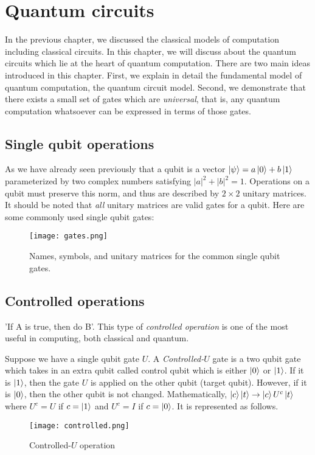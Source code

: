 \section{Quantum circuits}

In the previous chapter, we discussed the classical models of computation including classical circuits. In this chapter, we will discuss about the quantum circuits which lie at the heart of quantum computation. There are two main ideas introduced in this chapter. First, we explain in detail the fundamental model of quantum computation, the quantum circuit model. Second, we demonstrate that there exists a small set of gates which are \textit{universal}, that is, any quantum computation whatsoever can be expressed in terms of those gates.

\subsection{Single qubit operations}

As we have already seen previously that a qubit is a vector $\ket{\psi} = a\ket{0} + b\ket{1}$ parameterized by two complex numbers satisfying $|a|^2 + |b|^2 = 1$. Operations on a qubit must preserve this norm, and thus are described by $2 \times 2$ unitary matrices. It should be noted that \textit{all} unitary matrices are valid gates for a qubit. Here are some commonly used single qubit gates: 
\begin{figure}[h]
    \centering
    \texttt{[image: gates.png]}
    \caption{Names, symbols, and unitary matrices for the common single qubit gates.}
\end{figure}
\vspace{1em}

\subsection{Controlled operations}

'If A is true, then do B'. This type of \textit{controlled operation} is one of the most useful in computing, both classical and quantum.
\vspace{1em}

Suppose we have a single qubit gate $U$. A \textit{Controlled-$U$} gate is a two qubit gate which takes in an extra qubit called control qubit which is either $\ket{0}$ or $\ket{1}$. If it is $\ket{1}$, then the gate $U$ is applied on the other qubit (target qubit). However, if it is $\ket{0}$, then the other qubit is not changed. Mathematically, $\ket{c}\ket{t} \rightarrow \ket{c}U^c\ket{t}$ where $U^c = U$ if $c = \ket{1}$ and $U^c = I$ if $c = \ket{0}$. It is represented as follows.
\begin{figure}[h]
    \centering
    \texttt{[image: controlled.png]}
    \caption{Controlled-$U$ operation}
\end{figure}
\vspace{1em}

